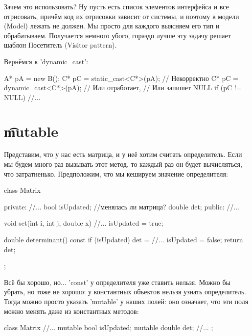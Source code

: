 Зачем это использовать?
Ну пусть есть список элементов интерфейса и все отрисовать, причём код их отрисовки зависит от системы,
и поэтому в модели (Model) лежать не должен.
Мы просто для каждого выясняем его тип и обрабатываем.
Получается немного убого, гораздо лучше эту задачу решает шаблон Посетитель (Visitor pattern).

Вернёмся к \cpp'dynamic_cast':
\begin{cppcode}
A* pA = new B();
C* pC = static_cast<C*>(pA); // Некорректно
C* pC = dynamic_cast<C*>(pA); // Или отработает,
							  // Или запишет NULL
if (pC != NULL)
	//...
\end{cppcode}

\section{\t{mutable}}

Представим, что у нас есть матрица, и у неё хотим считать определитель.
Если мы будем много раз вызывать этот метод, то каждый раз он будет вычисляться, что затратненько.
Предположим, что мы кешируем значение определителя:
\begin{cppcode}
class Matrix {
private:
	//...
	bool isUpdated; //менялась ли матрица?
	double det;
public:
	//...

	void set(int i, int j, double x) {
		//...
		isUpdated = true;
	}

	double determinant() const {
		if (isUpdated) {
			det = //...
			isUpdated = false;
		}
		return det;
	}
};
\end{cppcode}
Всё бы хорошо, но... \cpp'const' у определителя уже ставить нельзя.
Можно бы убрать, но тоже не хорошо: у константных объектов нельзя узнать определитель.
Тогда можно просто указать \cpp'mutable' у наших полей: оно означает, что эти поля можно менять даже из константных методов:
\begin{cppcode}
class Matrix {
	//...
	mutable bool isUpdated;
	mutable double det;
	//...
};
\end{cppcode}
